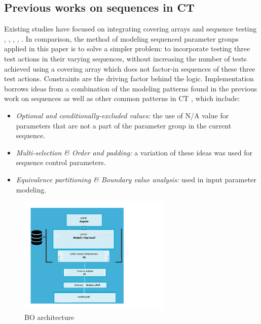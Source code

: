 \documentclass[conference]{IEEEtran}
\begin{document}
	\subsection{Previous works on sequences in CT} \label{Previous works on sequences}
	Existing studies have focused on integrating covering arrays and sequence testing \cite{kuhn2012combinatorial}, \cite{farchi2014combinatorial}, \cite{brain2012event}, \cite{yang2018effect}, \cite{erdem2011answer}.
	In comparison, the method of modeling sequenced parameter groups applied in this paper is to solve a simpler problem:
	to incorporate testing three test actions in their varying sequences, without increasing the number of tests achieved using a covering array which does not factor-in sequences of these three test actions.
	Constraints are the driving factor behind the logic. Implementation borrows ideas from a combination of the modeling patterns found in the previous work on sequences as well as other common patterns in CT \cite{segall2012common}, which include: 
	\begin{itemize}
		\item \textit{Optional and conditionally-excluded values:} the use of N/A value for parameters that are not a part of the parameter group in the current sequence.
		\item	\textit{Multi-selection \& Order and padding:} a variation of these ideas was used for sequence control parameters.
		\item \textit{Equivalence partitioning \& Boundary value analysis:} used in input parameter modeling.
	\end{itemize}

	\begin{figure}[!b]
		\includegraphics[width=0.65\textwidth,]{architecture.pdf}
		\caption{BO architecture}
		\label{fig:BOIC architecture}
	\end{figure}
\end{document}
